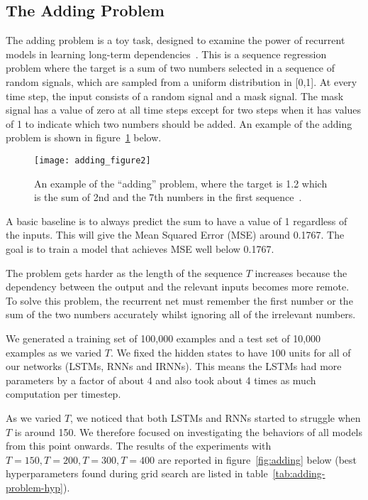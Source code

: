\documentclass{article} \usepackage{nips14submit_e,times,graphicx}
\begin{document}
\subsection{The Adding Problem}
The adding problem is a toy task, designed to examine the power of
recurrent models in learning long-term
dependencies~\cite{hochreiter97,hoch01}. This is a sequence regression
problem where the target is a sum of two numbers selected in a
sequence of random signals, which are sampled from a uniform
distribution in [0,1]. At every time step, the input consists of a
random signal and a mask signal. The mask signal has a value of zero
at all time steps except for two steps when it has values of 1 to
indicate which two numbers should be added. An example of the adding
problem is shown in figure~\ref{fig:add} below.

\begin{figure}[h!]
\centering
\texttt{[image: adding\_figure2]}
\caption{An example of the ``adding'' problem, where the target is 1.2
  which is the sum of 2nd and the 7th numbers in the first
  sequence~\cite{martens11}.}
\label{fig:add}
\end{figure}



A basic baseline is to always predict the sum to have a value of 1
regardless of the inputs. This will give the Mean Squared Error (MSE)
around 0.1767. The goal is to train a model that achieves MSE well
below 0.1767.

The problem gets harder as the length of the sequence $T$ increases
because the dependency between the output and the relevant inputs
becomes more remote. To solve this problem, the recurrent net must
remember the first number or the sum of the two numbers accurately
whilst ignoring all of the irrelevant numbers.

We generated a training set of 100,000 examples and a test set of
10,000 examples as we varied $T$.  We fixed the hidden states to have
$100$ units for all of our networks (LSTMs, RNNs and IRNNs). This
means the LSTMs had more parameters by a factor of about 4 and also
took about 4 times as much computation per timestep.

As we varied $T$, we noticed that both LSTMs and RNNs started to
struggle when $T$ is around 150. We therefore focused on investigating
the behaviors of all models from this point onwards. The results of
the experiments with $T = 150, T = 200, T = 300, T = 400$ are reported
in figure~\ref{fig:adding} below (best hyperparameters found during
grid search are listed in table~\ref{tab:adding-problem-hyp}).
\end{document}

